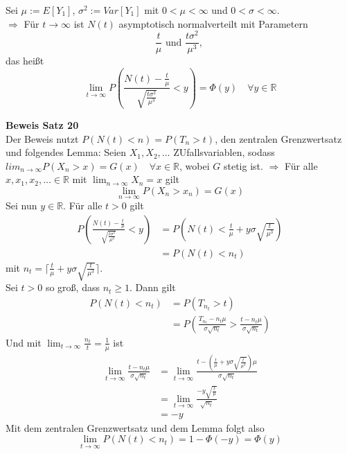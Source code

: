 \documentclass[a4paper,12pt]{article}
\begin{document}
\begin{tcolorbox}[breakable, colframe=green, colback=white, title=Satz 20]
Sei $\mu := E[Y_1]$, $\sigma^2 := Var[Y_1]$ mit $0 < \mu < \infty$ und $0 < \sigma < \infty$.\\
$\Rightarrow$ Für $t \to \infty$ ist $N(t)$ asymptotisch normalverteilt mit Parametern
$$
\frac{t}{\mu} \text{ und } \frac{t \sigma^2}{\mu^3} \text{, }
$$
das heißt 
$$
\lim_{t \to \infty} P  \left(  
\frac{N(t) - \frac{t}{\mu}}{\sqrt{\frac{t\sigma^2}{\mu^3}}} <y
     \right) = \Phi(y) \quad \forall y \in \mathbb{R}
$$
\end{tcolorbox}
\textbf{Beweis Satz 20}\\
Der Beweis nutzt $P(N(t)< n) = P(T_n > t)$, den zentralen Grenzwertsatz und folgendes Lemma:
Seien $X_1, X_2, ...$ ZUfallsvariablen, sodass $lim_{n \to \infty}P(X_n > x) = G(x) \quad \forall x \in \mathbb{R}$,
wobei $G$ stetig ist.
$\Rightarrow$ Für alle $x,x_1,x_2, ... \in \mathbb{R}$ mit $\lim_{n \to \infty}X_n = x$ gilt
$$
\lim_{n \to \infty} P(X_n > x_n) = G(x)
$$
Sei nun $y \in \mathbb{R}$. Für alle $t>0$ gilt
\begin{align*}
	P  \left(  
		\frac{N(t) - \frac{t}{\mu}}{\sqrt{\frac{t\sigma^2}{\mu^3}}} <y
			 \right) & =
P \left(N(t) < \frac{t}{\mu} + y \sigma \sqrt{\frac{t}{\mu^3}}  \right) \\
& = P(N(t)<n_t)
\end{align*}
mit $n_t = \lceil \frac{t}{\mu} + y \sigma \sqrt{\frac{t}{\mu^3}} \rceil $.\\
Sei $t>0$ so groß, dass $n_t \geq 1$. Dann gilt
\begin{align*}
P(N(t)<n_t) & = P(T_{n_t}>t) \\
& = P  \left(
\frac{T_{n_t} - n_t \mu}{\sigma \sqrt{n_t}} >
\frac{t - n_t \mu}{\sigma \sqrt{n_t}}
\right)
\end{align*}
Und mit $\lim_{t \to \infty} \frac{n_t}{t} = \frac{1}{\mu}$ ist
\begin{align*}
\lim_{t \to \infty}
\frac{t - n_t \mu}{\sigma \sqrt{n_t}} & = 
\lim_{t \to \infty} \frac{t- (\frac{t}{\mu} + y \sigma \sqrt{\frac{t}{\mu^3}})\mu}{\sigma \sqrt{n_t}} \\
& = \lim_{t \to \infty} \frac{-y \sqrt{\frac{t}{\mu}}}{\sqrt{n_t}} \\
& = -y
\end{align*}
Mit dem zentralen Grenzwertsatz und dem Lemma folgt also 
$$
\lim_{t \to \infty} P(N(t) < n_t) = 1- \Phi(-y) = \Phi(y)
$$
\end{document}

